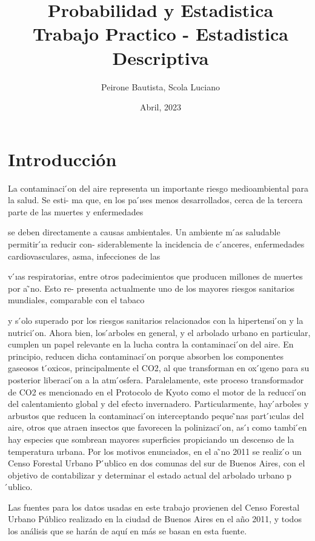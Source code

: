 \documentclass[a4paper]{article}
\title{
  Probabilidad y Estadistica\\
  Trabajo Practico - Estadistica Descriptiva
}
\author{Peirone Bautista, Scola Luciano}
\date{Abril, 2023}
\begin{document}
\begin{titlepage}
\maketitle
\thispagestyle{empty} %
\end{titlepage}
\newpage

\section{Introducción} %
La contaminaci ́on del aire representa un importante riesgo medioambiental para la salud. Se esti-
ma que, en los pa ́ıses menos desarrollados, cerca de la tercera parte de las muertes y enfermedades

se deben directamente a causas ambientales. Un ambiente m ́as saludable permitir ́ıa reducir con-
siderablemente la incidencia de c ́anceres, enfermedades cardiovasculares, asma, infecciones de las

v ́ıas respiratorias, entre otros padecimientos que producen millones de muertes por a ̃no. Esto re-
presenta actualmente uno de los mayores riesgos sanitarios mundiales, comparable con el tabaco

y s ́olo superado por los riesgos sanitarios relacionados con la hipertensi ́on y la nutrici ́on.
Ahora bien, los  ́arboles en general, y el arbolado urbano en particular, cumplen un papel relevante
en la lucha contra la contaminaci ́on del aire. En principio, reducen dicha contaminaci ́on porque
absorben los componentes gaseosos t ́oxicos, principalmente el CO2, al que transforman en ox ́ıgeno
para su posterior liberaci ́on a la atm ́osfera. Paralelamente, este proceso transformador de CO2
es mencionado en el Protocolo de Kyoto como el motor de la reducci ́on del calentamiento global
y del efecto invernadero. Particularmente, hay  ́arboles y arbustos que reducen la contaminaci ́on
interceptando peque ̃nas part ́ıculas del aire, otros que atraen insectos que favorecen la polinizaci ́on,
as ́ı como tambi ́en hay especies que sombrean mayores superficies propiciando un descenso de la
temperatura urbana.
Por los motivos enunciados, en el a ̃no 2011 se realiz ́o un Censo Forestal Urbano P ́ublico en dos
comunas del sur de Buenos Aires, con el objetivo de contabilizar y determinar el estado actual del
arbolado urbano p ́ublico.

Las fuentes para los datos usadas en este trabajo provienen del Censo Forestal
Urbano Público realizado en la ciudad de Buenos Aires en el año 2011, y todos
los análisis que se harán de aquí en más se basan en esta fuente.
\end{document}
